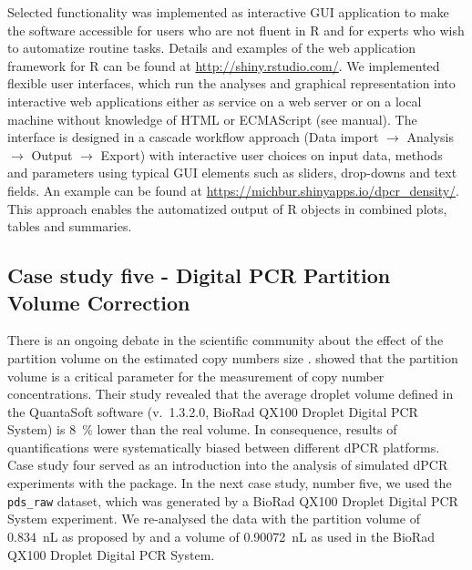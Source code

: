Selected functionality was implemented as interactive  GUI 
application to make the software accessible for users who are not fluent in R 
and for experts who wish to automatize routine tasks. Details and examples of 
the  web application framework for R can be found at 
\url{http://shiny.rstudio.com/}. We implemented flexible user interfaces, which 
run the analyses and graphical representation into interactive web applications 
either as service on a web server or on a local machine without knowledge of 
HTML or ECMAScript (see  manual). The interface is designed in a 
cascade workflow approach (Data import $\rightarrow$ Analysis $\rightarrow$ 
Output $\rightarrow$ Export) with interactive user choices on input data, 
methods and parameters using typical GUI elements such as sliders, drop-downs 
and text fields. An example can be found at 
\url{https://michbur.shinyapps.io/dpcr_density/}. This approach enables the 
automatized output of R objects in combined plots, tables and summaries.

\subsection{Case study five - Digital PCR Partition Volume Correction}

There is an ongoing debate in the scientific community about the effect of the 
partition volume on the estimated copy numbers size 
\citep{huggett_clinchem_2014, corbisier_2015, majumdar_2015}. 
\citet{corbisier_2015} showed that the partition volume is a critical parameter 
for the measurement of copy number concentrations. Their study revealed that the 
average droplet volume defined in the QuantaSoft software (v.~1.3.2.0, BioRad 
QX100 Droplet Digital PCR System) is 8~\% lower than the real volume. In 
consequence, results of quantifications were systematically biased between 
different dPCR platforms. Case study four served as an introduction into the 
analysis of simulated dPCR experiments with the  package. In the 
next case study, number five, we used the \texttt{pds\_raw} dataset, which was 
generated by a BioRad QX100 Droplet Digital PCR System experiment. We 
re-analysed the data with the partition volume of 0.834~nL as proposed by 
\citet{corbisier_2015} and a volume of 0.90072~nL as used in the BioRad QX100 
Droplet Digital PCR System.

